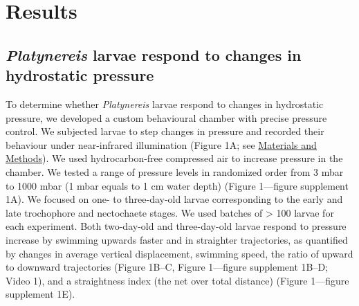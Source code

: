 \documentclass[
  11pt,
]{article}
\begin{document}
\section{Results}\label{results}

\subsection{\texorpdfstring{\emph{Platynereis} larvae respond to changes
in hydrostatic
pressure}{Platynereis larvae respond to changes in hydrostatic pressure}}\label{platynereis-larvae-respond-to-changes-in-hydrostatic-pressure}

To determine whether \emph{Platynereis} larvae respond to changes in
hydrostatic pressure, we developed a custom behavioural chamber with
precise pressure control. We subjected larvae to step changes in
pressure and recorded their behaviour under near-infrared illumination
(Figure 1A; see \hyperref[materials-and-methods]{Materials and
Methods}). We used hydrocarbon-free compressed air to increase pressure
in the chamber. We tested a range of pressure levels in randomized order
from 3 mbar to 1000 mbar (1 mbar equals to 1 cm water depth) (Figure
1---figure supplement 1A). We focused on one- to three-day-old larvae
corresponding to the early and late trochophore and nectochaete stages.
We used batches of \textgreater{} 100 larvae for each experiment. Both
two-day-old and three-day-old larvae respond to pressure increase by
swimming upwards faster and in straighter trajectories, as quantified by
changes in average vertical displacement, swimming speed, the ratio of
upward to downward trajectories (Figure 1B--C, Figure 1---figure
supplement 1B--D; Video 1), and a straightness index (the net over total
distance) (Figure 1---figure supplement 1E).
\end{document}
